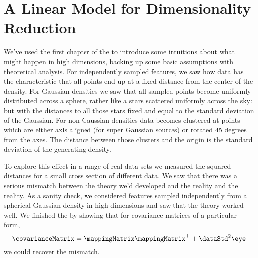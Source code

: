 \chapter{A Linear Model for Dimensionality Reduction}

We've used the first chapter of the  to introduce
some intuitions about what might happen in high dimensions, backing up
some basic assumptions with theoretical analysis. For independently
sampled features, we saw how data has the characteristic that all
points end up at a fixed distance from the center of the density. For
Gaussian densities we saw that all sampled points become uniformly
distributed across a sphere, rather like a stars scattered uniformly
across the sky: but with the distances to all those stars fixed and
equal to the standard deviation of the Gaussian. For non-Gaussian
densities data becomes clustered at points which are either axis
aligned (for super Gaussian sources) or rotated 45 degrees from the
axes. The distance between those clusters and the origin is the
standard deviation of the generating density.

To explore this effect in a range of real data sets we measured the
squared distances for a small cross section of different data. We saw
that there was a serious mismatch between the theory we'd developed
and the reality and the reality. As a sanity check, we considered
features sampled independently from a spherical Gaussian density in
high dimensions and saw that the theory worked well. We finished the
by showing that for covariance matrices of a particular form,
\[
\covarianceMatrix=\mappingMatrix\mappingMatrix^{\top}+\dataStd^{2}\eye
\]
we could recover the mismatch.

